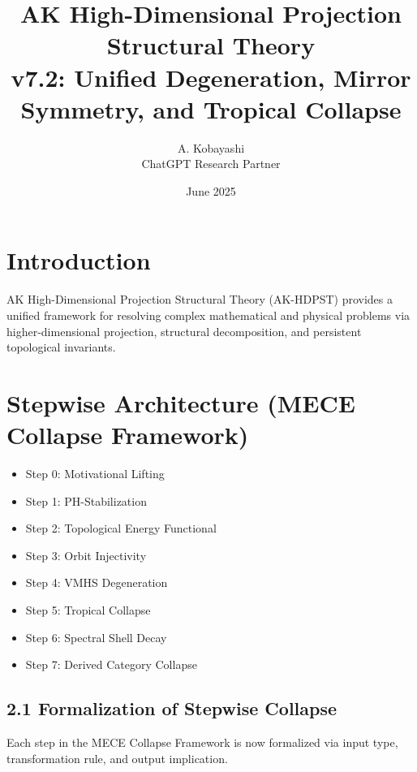 \documentclass[11pt]{article}
\title{AK High-Dimensional Projection Structural Theory\\
\large v7.2: Unified Degeneration, Mirror Symmetry, and Tropical Collapse}
\author{A. Kobayashi \\ ChatGPT Research Partner}
\date{June 2025}
\begin{document}
\maketitle

\tableofcontents
\newpage


\section{Introduction}
AK High-Dimensional Projection Structural Theory (AK-HDPST) provides a unified framework for resolving complex mathematical and physical problems via higher-dimensional projection, structural decomposition, and persistent topological invariants.


\section{Stepwise Architecture (MECE Collapse Framework)}
\begin{itemize}
    \item Step 0: Motivational Lifting
    \item Step 1: PH-Stabilization
    \item Step 2: Topological Energy Functional
    \item Step 3: Orbit Injectivity
    \item Step 4: VMHS Degeneration
    \item Step 5: Tropical Collapse
    \item Step 6: Spectral Shell Decay
    \item Step 7: Derived Category Collapse
\end{itemize}

\subsection*{2.1 Formalization of Stepwise Collapse}

Each step in the MECE Collapse Framework is now formalized via input type, transformation rule, and output implication.
\end{document}
